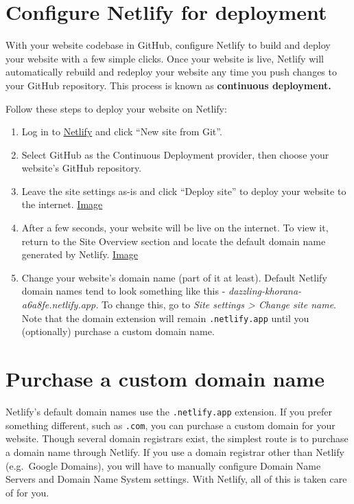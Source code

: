 \documentclass[
]{book}
\begin{document}
\hypertarget{configure-netlify-for-deployment}{%
\section{Configure Netlify for deployment}\label{configure-netlify-for-deployment}}

With your website codebase in GitHub, configure Netlify to build and deploy your website with a few simple clicks. Once your website is live, Netlify will automatically rebuild and redeploy your website any time you push changes to your GitHub repository. This process is known as \textbf{continuous deployment.}

Follow these steps to deploy your website on Netlify:

\begin{enumerate}
\def\labelenumi{\arabic{enumi}.}
\item
  Log in to \href{https://app.netlify.com/}{Netlify} and click ``New site from Git''.
\item
  Select GitHub as the Continuous Deployment provider, then choose your website's GitHub repository.
\item
  Leave the site settings as-is and click ``Deploy site'' to deploy your website to the internet. \href{https://i.imgur.com/wjDFnvJ.png}{Image}
\item
  After a few seconds, your website will be live on the internet. To view it, return to the Site Overview section and locate the default domain name generated by Netlify. \href{https://i.imgur.com/t6IW44i.png}{Image}
\item
  Change your website's domain name (part of it at least). Default Netlify domain names tend to look something like this - \emph{dazzling-khorana-a6a8fe.netlify.app.} To change this, go to \emph{Site settings \textgreater{} Change site name}. Note that the domain extension will remain \texttt{.netlify.app} until you (optionally) purchase a custom domain name.
\end{enumerate}

\hypertarget{purchase-a-custom-domain-name}{%
\section{Purchase a custom domain name}\label{purchase-a-custom-domain-name}}

Netlify's default domain names use the \texttt{.netlify.app} extension. If you prefer something different, such as \texttt{.com}, you can purchase a custom domain for your website. Though several domain registrars exist, the simplest route is to purchase a domain name through Netlify. If you use a domain registrar other than Netlify (e.g.~Google Domains), you will have to manually configure Domain Name Servers and Domain Name System settings. With Netlify, all of this is taken care of for you.
\end{document}
